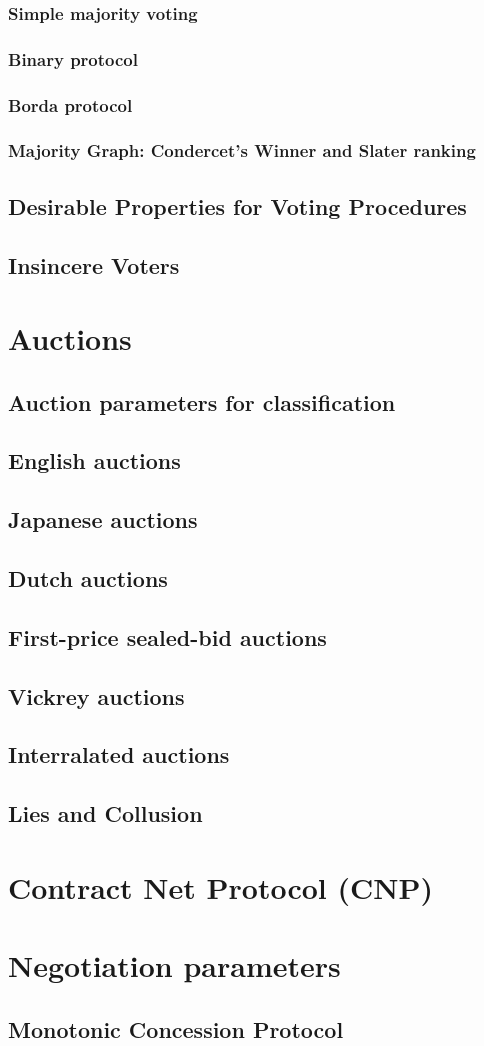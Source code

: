 \subsubsection{Simple majority voting}
\subsubsection{Binary protocol}
\subsubsection{Borda protocol}
\subsubsection{Majority Graph: Condercet's Winner and Slater ranking}
\subsection{Desirable Properties for Voting Procedures}
\subsection{Insincere Voters}


\section{Auctions}
\subsection{Auction parameters for classification}
\subsection{English auctions}
\subsection{Japanese auctions}
\subsection{Dutch auctions}
\subsection{First-price sealed-bid auctions}
\subsection{Vickrey auctions}
\subsection{Interralated auctions}
\subsection{Lies and Collusion}
\section{Contract Net Protocol (CNP)}

\section{Negotiation parameters}
\subsection{Monotonic Concession Protocol}
